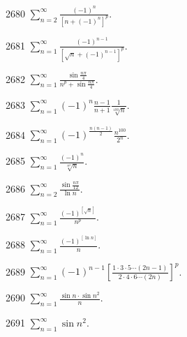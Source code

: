 \begin{prob}[S]{2680}
$\sum_{n=2}^{\infty} \frac{(-1)^n}{[n + (-1)^n]^p}$.
\end{prob}

\begin{prob}[S]{2681}
$\sum_{n=1}^{\infty} \frac{(-1)^{n-1}}{[\sqrt{n} + (-1)^{n-1}]^p}$.
\end{prob}

\begin{prob}[S]{2682}
$\sum_{n=1}^{\infty} \frac{\sin \frac{n\pi}{4}}{n^p + \sin \frac{n\pi}{4}}$.
\end{prob}

\begin{prob}[S]{2683}
$\sum_{n=1}^{\infty} (-1)^n \frac{n-1}{n+1} \frac{1}{\sqrt[100]{n}}$.
\end{prob}

\begin{prob}[S]{2684}
$\sum_{n=1}^{\infty} (-1)^{\frac{n(n-1)}{2}} \frac{n^{100}}{2^n}$.
\end{prob}

\begin{prob}[S]{2685}
$\sum_{n=1}^{\infty} \frac{(-1)^n}{\sqrt[n^2]{n}}$.
\end{prob}

\begin{prob}[S]{2686}
$\sum_{n=2}^{\infty} \frac{\sin \frac{n\pi}{12}}{\ln n}$.
\end{prob}

\begin{prob}[S]{2687}
$\sum_{n=1}^{\infty} \frac{(-1)^{[\sqrt{n}]}}{n^p}$.
\end{prob}

\begin{prob}[S]{2688}
$\sum_{n=1}^{\infty} \frac{(-1)^{[\ln n]}}{n}$.
\end{prob}

\begin{prob}[S]{2689}
$\sum_{n=1}^{\infty} (-1)^{n-1} \left[\frac{1 \cdot 3 \cdot 5 \cdots (2n-1)}{2 \cdot 4 \cdot 6 \cdots (2n)}\right]^p$.
\end{prob}

\begin{prob}[S]{2690}
$\sum_{n=1}^{\infty} \frac{\sin n \cdot \sin n^2}{n}$.
\end{prob}

\begin{prob}[M]{2691}
$\sum_{n=1}^{\infty} \sin n^2$.
\end{prob}

